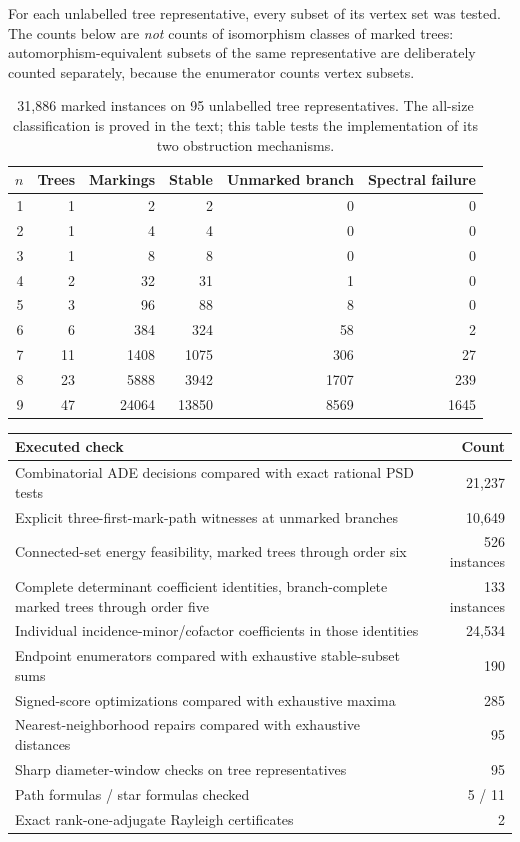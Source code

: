 \documentclass[11pt]{article}
\numberwithin{equation}{section}
\theoremstyle{definition}
\begin{document}
For each unlabelled tree representative, every subset of its vertex set
was tested. The counts below are \emph{not} counts of isomorphism classes
of marked trees: automorphism-equivalent subsets of the same representative
are deliberately counted separately, because the enumerator counts
vertex subsets.

\begin{table}[htbp]
\centering\small
\begin{tabular}{rrrrrr}
\toprule
$n$ & Trees & Markings & Stable & Unmarked branch & Spectral failure\\
\midrule
1&1&2&2&0&0\\
2&1&4&4&0&0\\
3&1&8&8&0&0\\
4&2&32&31&1&0\\
5&3&96&88&8&0\\
6&6&384&324&58&2\\
7&11&1408&1075&306&27\\
8&23&5888&3942&1707&239\\
9&47&24064&13850&8569&1645\\
\bottomrule
\end{tabular}
\caption{31,886 marked instances on 95 unlabelled tree representatives.
The all-size classification is proved in the text; this table tests the
implementation of its two obstruction mechanisms.}
\label{mts:tab:tests}
\end{table}

\begin{center}\small
\begin{tabularx}{\textwidth}{@{}Xr@{}}
\toprule
Executed check & Count\\
\midrule
Combinatorial ADE decisions compared with exact rational PSD tests &21,237\\
Explicit three-first-mark-path witnesses at unmarked branches &10,649\\
Connected-set energy feasibility, marked trees through order six &526 instances\\
Complete determinant coefficient identities, branch-complete marked trees through order five &133 instances\\
Individual incidence-minor/cofactor coefficients in those identities &24,534\\
Endpoint enumerators compared with exhaustive stable-subset sums &190\\
Signed-score optimizations compared with exhaustive maxima &285\\
Nearest-neighborhood repairs compared with exhaustive distances &95\\
Sharp diameter-window checks on tree representatives &95\\
Path formulas / star formulas checked &5 / 11\\
Exact rank-one-adjugate Rayleigh certificates &2\\
\bottomrule
\end{tabularx}
\end{center}
\end{document}
